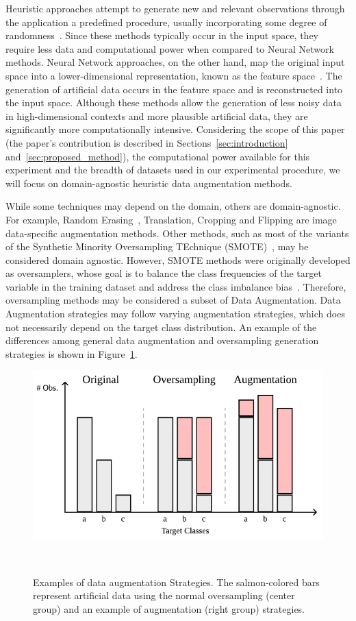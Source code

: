 \documentclass[preprint, 12pt]{elsarticle}
\begin{document}
Heuristic approaches attempt to generate new and relevant observations through
the application a predefined procedure, usually incorporating some degree of
randomness~\cite{Kashefi2020}. Since these methods typically occur in the
input space, they require less data and computational power when compared to
Neural Network methods. Neural Network approaches, on the other hand, map the
original input space into a lower-dimensional representation, known as the
feature space~\cite{DeVries2017}. The generation of artificial data occurs in
the feature space and is reconstructed into the input space. Although these
methods allow the generation of less noisy data in high-dimensional contexts
and more plausible artificial data, they are significantly more
computationally intensive. Considering the scope of this paper (the paper's
contribution is described in Sections~\ref{sec:introduction}
and~\ref{sec:proposed_method}), the computational power available for this
experiment and the breadth of datasets used in our experimental procedure, we
will focus on domain-agnostic heuristic data augmentation methods.

While some techniques may depend on the domain, others are domain-agnostic.
For example, Random Erasing~\cite{Zhong2020}, Translation, Cropping and
Flipping are image data-specific augmentation methods. Other methods, such as
most of the variants of the Synthetic Minority Oversampling TEchnique
(SMOTE)~\cite{Chawla2002}, may be considered domain agnostic. However, SMOTE
methods were originally developed as oversamplers, whose goal is to balance
the class frequencies of the target variable in the training dataset and
address the class imbalance bias~\cite{Fonseca2021ksmote}. Therefore,
oversampling methods may be considered a subset of Data Augmentation. Data
Augmentation strategies may follow varying augmentation strategies, which does
not necessarily depend on the target class distribution. An example of the
differences among general data augmentation and oversampling generation
strategies is shown in Figure~\ref{fig:augmentation_strategies}.

\begin{figure}[H]
	\centering
	\includegraphics[width=.6\linewidth]{../analysis/augmentation_strategies}
    \caption{%
        Examples of data augmentation Strategies. The salmon-colored bars
        represent artificial data using the normal oversampling (center group) and
        an example of augmentation (right group) strategies.
    }~\label{fig:augmentation_strategies}
\end{figure}
\end{document}
